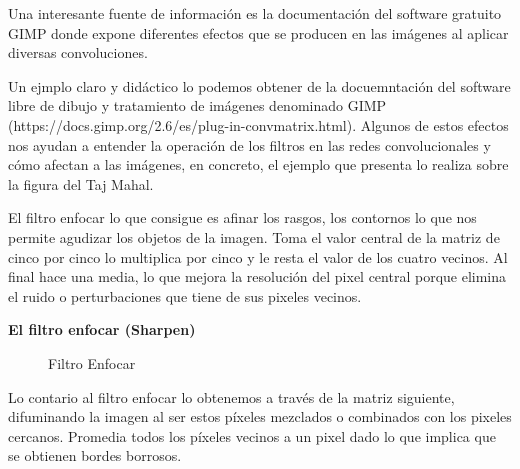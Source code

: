 \documentclass[
  a4paper,
  DIV=11,
  numbers=noendperiod]{scrreprt}
\begin{document}
Una interesante fuente de información es la documentación del software
gratuito GIMP donde expone diferentes efectos que se producen en las
imágenes al aplicar diversas convoluciones.

Un ejmplo claro y didáctico lo podemos obtener de la docuemntación del
software libre de dibujo y tratamiento de imágenes denominado GIMP
(https://docs.gimp.org/2.6/es/plug-in-convmatrix.html). Algunos de estos
efectos nos ayudan a entender la operación de los filtros en las redes
convolucionales y cómo afectan a las imágenes, en concreto, el ejemplo
que presenta lo realiza sobre la figura del Taj Mahal.

El filtro enfocar lo que consigue es afinar los rasgos, los contornos lo
que nos permite agudizar los objetos de la imagen. Toma el valor central
de la matriz de cinco por cinco lo multiplica por cinco y le resta el
valor de los cuatro vecinos. Al final hace una media, lo que mejora la
resolución del pixel central porque elimina el ruido o perturbaciones
que tiene de sus pixeles vecinos.

\textbf{El filtro enfocar (Sharpen)}

\begin{figure}


\caption{\label{fig-filtro_enfocar}Filtro Enfocar}

\end{figure}%

Lo contario al filtro enfocar lo obtenemos a través de la matriz
siguiente, difuminando la imagen al ser estos píxeles mezclados o
combinados con los pixeles cercanos. Promedia todos los píxeles vecinos
a un pixel dado lo que implica que se obtienen bordes borrosos.
\end{document}
